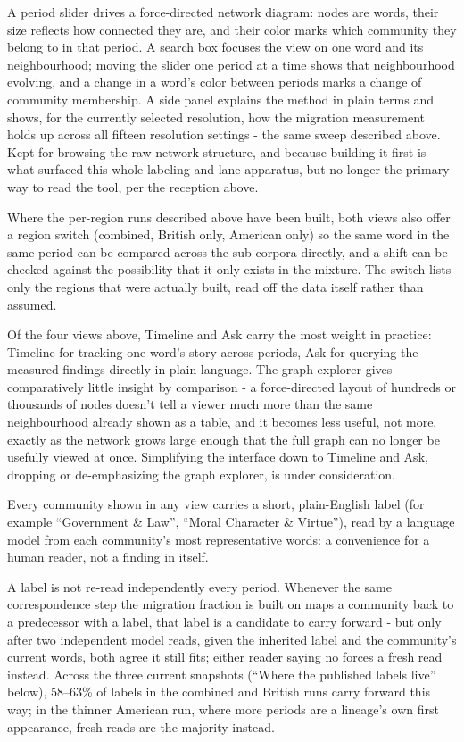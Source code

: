 \documentclass[11pt]{article}
\begin{document}
 A period slider drives a force-directed network
diagram: nodes are words, their size reflects how connected they are,
and their color marks which community they belong to in that period. A
search box focuses the view on one word and its neighbourhood; moving the
slider one period at a time shows that neighbourhood evolving, and a
change in a word's color between periods marks a change of community
membership. A side panel explains the method in plain terms and shows,
for the currently selected resolution, how the migration measurement
holds up across all fifteen resolution settings - the same sweep
described above. Kept for browsing the raw network
structure, and because building it first is what surfaced this whole
labeling and lane apparatus, but no longer the primary way to read the
tool, per the reception above.

 Where the per-region runs described above have been
built, both views also offer a region switch (combined, British only,
American only) so the same word in the same period can be compared across
the sub-corpora directly, and a shift can be checked against the possibility
that it only exists in the mixture. The switch lists only the regions that
were actually built, read off the data itself rather than assumed.

 Of the four views above,
Timeline and Ask carry the most weight in practice: Timeline for
tracking one word's story across periods, Ask for querying the
measured findings directly in plain language. The graph explorer gives
comparatively little insight by comparison - a force-directed layout
of hundreds or thousands of nodes doesn't tell a viewer much more than
the same neighbourhood already shown as a table, and it becomes less
useful, not more, exactly as the network grows large enough that the
full graph can no longer be usefully viewed at once. Simplifying the
interface down to Timeline and Ask, dropping or de-emphasizing the
graph explorer, is under consideration.

Every community shown in any view carries a short, plain-English label
(for example ``Government \& Law'', ``Moral Character \& Virtue''), read
by a language model from each community's most representative words: a
convenience for a human reader, not a finding in itself.

A label is not
re-read independently every period. Whenever the same correspondence
step the migration fraction is built on maps a community back to a
predecessor with a label, that label is a candidate to carry forward -
but only after two independent model reads, given the inherited label
and the community's current words, both agree it still fits; either
reader saying no forces a fresh read instead. Across the three current
snapshots (``Where the published labels live'' below), 58--63\% of
labels in the combined and British runs carry forward this
way; in the thinner American run, where more periods are a lineage's own
first appearance, fresh reads are the majority instead.
\end{document}
